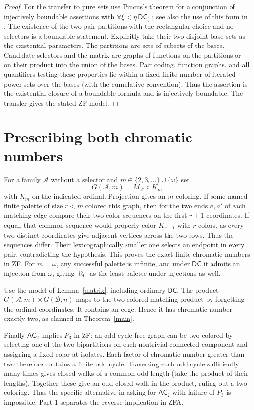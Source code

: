 \documentclass[11pt]{article}
\newcommand{\DC}{\mathsf{DC}}
\newcommand{\AC}{\mathsf{AC}}
\begin{document}
\begin{proof}
For the transfer to pure sets use Pincus's theorem for a conjunction of injectively boundable assertions with $\forall\xi<\eta\,\DC_\xi$ \cite[Theorem 4]{pincus}; see also the use of this form in \cite[proof of Theorem 4.12]{transfer}. The existence of the two pair partitions with the rectangular choice and no selectors is a boundable statement. Explicitly take their two disjoint base sets as the existential parameters. The partitions are sets of subsets of the bases. Candidate selectors and the matrix are graphs of functions on the partitions or on their product into the union of the bases. Pair coding, function graphs, and all quantifiers testing these properties lie within a fixed finite number of iterated power sets over the bases (with the cumulative convention). Thus the assertion is the existential closure of a boundable formula and is injectively boundable. The transfer gives the stated ZF model.
\end{proof}

\section{Prescribing both chromatic numbers}
For a family $\mathcal A$ without a selector and $m\in\{2,3,\ldots\}\cup\{\omega\}$ set
\[
 G(\mathcal A,m)=M_{\mathcal A}\times K_m
\]
with $K_m$ on the indicated ordinal. Projection gives an $m$-coloring. If some named finite palette of size $r<m$ colored this graph, then for the two ends $a,a'$ of each matching edge compare their two color sequences on the first $r+1$ coordinates. If equal, that common sequence would properly color $K_{r+1}$ with $r$ colors, as every two distinct coordinates give adjacent vertices across the two rows. Thus the sequences differ. Their lexicographically smaller one selects an endpoint in every pair, contradicting the hypothesis. This proves the exact finite chromatic numbers in ZF. For $m=\omega$, any successful palette is infinite, and under $\DC$ it admits an injection from $\omega$, giving $\aleph_0$ as the least palette under injections as well.

Use the model of Lemma~\ref{matrix}, including ordinary $\DC$. The product $G(\mathcal A,m)\times G(\mathcal B,n)$ maps to the two-colored matching product by forgetting the ordinal coordinates. It contains an edge. Hence it has chromatic number exactly two, as claimed in Theorem~\ref{main}.

Finally $\AC_2$ implies $P_3$ in ZF: an odd-cycle-free graph can be two-colored by selecting one of the two bipartitions on each nontrivial connected component and assigning a fixed color at isolates. Each factor of chromatic number greater than two therefore contains a finite odd cycle. Traversing each odd cycle sufficiently many times gives closed walks of a common odd length (take the product of their lengths). Together these give an odd closed walk in the product, ruling out a two-coloring. Thus the specific alternative in \cite[Question 6.2]{b} asking for $\AC_2$ with failure of $P_3$ is impossible. Part 1 separates the reverse implication in ZFA.
\end{document}
